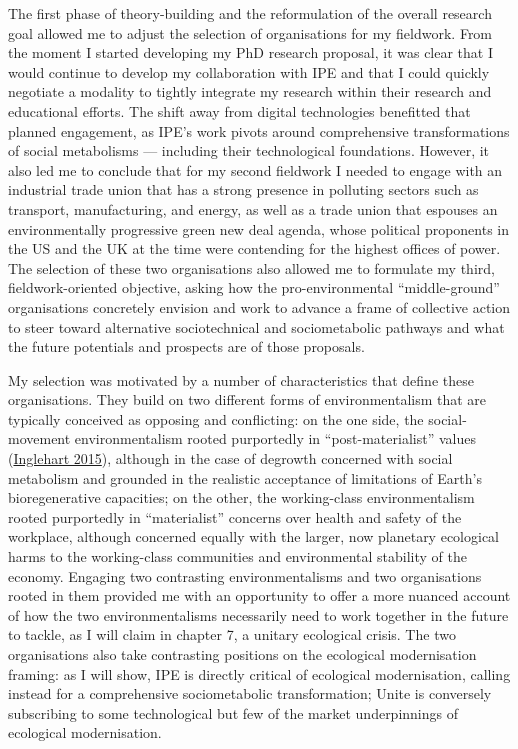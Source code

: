 \documentclass[a4paper, nobind]{templates/ociamthesis}
\begin{document}
The first phase of theory-building and the reformulation of the overall research goal allowed me to adjust the selection of organisations for my fieldwork. From the moment I started developing my PhD research proposal, it was clear that I would continue to develop my collaboration with IPE and that I could quickly negotiate a modality to tightly integrate my research within their research and educational efforts. The shift away from digital technologies benefitted that planned engagement, as IPE's work pivots around comprehensive transformations of social metabolisms --- including their technological foundations. However, it also led me to conclude that for my second fieldwork I needed to engage with an industrial trade union that has a strong presence in polluting sectors such as transport, manufacturing, and energy, as well as a trade union that espouses an environmentally progressive green new deal agenda, whose political proponents in the US and the UK at the time were contending for the highest offices of power. The selection of these two organisations also allowed me to formulate my third, fieldwork-oriented objective, asking how the pro-environmental ``middle-ground'' organisations concretely envision and work to advance a frame of collective action to steer toward alternative sociotechnical and sociometabolic pathways and what the future potentials and prospects are of those proposals.

My selection was motivated by a number of characteristics that define these organisations. They build on two different forms of environmentalism that are typically conceived as opposing and conflicting: on the one side, the social-movement environmentalism rooted purportedly in ``post-materialist'' values (\protect\hyperlink{ref-inglehart_silent_2015}{Inglehart 2015}), although in the case of degrowth concerned with social metabolism and grounded in the realistic acceptance of limitations of Earth's bioregenerative capacities; on the other, the working-class environmentalism rooted purportedly in ``materialist'' concerns over health and safety of the workplace, although concerned equally with the larger, now planetary ecological harms to the working-class communities and environmental stability of the economy. Engaging two contrasting environmentalisms and two organisations rooted in them provided me with an opportunity to offer a more nuanced account of how the two environmentalisms necessarily need to work together in the future to tackle, as I will claim in chapter 7, a unitary ecological crisis. The two organisations also take contrasting positions on the ecological modernisation framing: as I will show, IPE is directly critical of ecological modernisation, calling instead for a comprehensive sociometabolic transformation; Unite is conversely subscribing to some technological but few of the market underpinnings of ecological modernisation.
\end{document}
